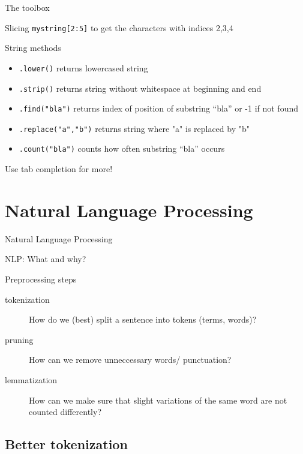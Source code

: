 \documentclass[compress]{beamer}
\begin{document}
\begin{frame}{The toolbox}
	\begin{block}{Slicing}
		\texttt{mystring[2:5]} to get the characters with indices 2,3,4
	\end{block}
	
	\begin{block}{String methods}
		\begin{itemize}
			\item \texttt{.lower()} returns lowercased string
			\item \texttt{.strip()} returns string without whitespace at beginning and end
			\item \texttt{.find("bla")} returns index of position of substring ``bla'' or -1 if not found
			\item \texttt{.replace("a","b")} returns string where "a" is replaced by "b"
			\item \texttt{.count("bla")} counts how often substring ``bla'' occurs
		\end{itemize}
		Use tab completion for more!
	\end{block}
\end{frame}

\section{Natural Language Processing}
\begin{frame}
	Natural Language Processing
\end{frame}

\begin{frame}{NLP: What and why?}
	\begin{block}{Preprocessing steps}
		\begin{description}
			\item [tokenization] How do we (best) split a sentence into tokens (terms, words)?
			\item [pruning] How can we remove unneccessary words/ punctuation?
			\item [lemmatization] How can we make sure that slight variations of the same word are not counted differently?
		\end{description}
	\end{block}
\end{frame}


\subsection{Better tokenization}
\end{document}
